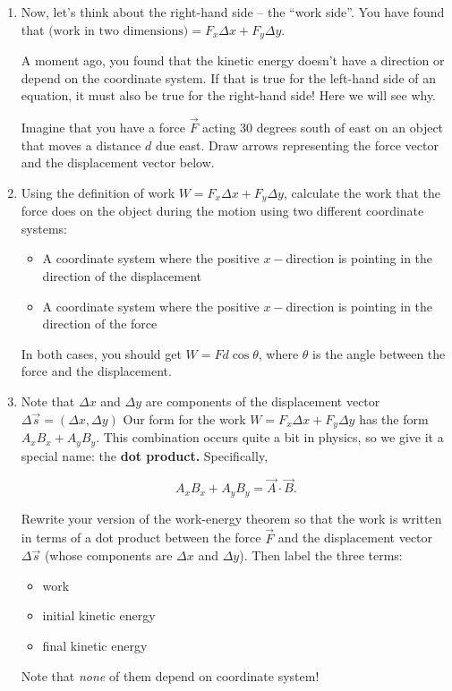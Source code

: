 \documentclass[12pt]{article}
\begin{document}
\begin{enumerate}
\item Now, let's think about the right-hand side -- the ``work side''. You have found that 
$\text{(work in two dimensions)} = F_x \Delta x + F_y \Delta y.$

A moment ago, you found that the kinetic energy doesn't have a direction or depend on the coordinate system. If that is true for the left-hand side of an equation, it must also be true for the right-hand side! Here we will see why.

Imagine that you have a force $\vec F$ acting 30 degrees south of east on an object that moves a distance $d$ due east. Draw arrows representing the force vector and the displacement vector below.
\vspace{2in}


\item Using the definition of work $W = F_x \Delta x + F_y \Delta y$, calculate the work that the force does on the object during the motion using two different coordinate systems:

\begin{itemize}
\item A coordinate system where the positive $x-$direction is pointing in the direction of the displacement

\item A coordinate system where the positive $x-$direction is pointing in the direction of the force
\end{itemize}

In both cases, you should get $W = F d \cos \theta$, where $\theta$ is the angle between the force and the displacement.

\bigskip
\newpage
\item Note that $\Delta x$ and $\Delta y$ are components of the displacement vector $\Delta \vec s = (\Delta x, \Delta y)$ Our form for the work $W = F_x \Delta x + F_y \Delta y$ has the form $A_x B_x + A_y B_y$. This combination occurs quite a bit in physics, so we give it a special name: the {\bf dot product.} Specifically,

$$A_x B_x + A_y B_y = \vec A \cdot \vec B.$$

Rewrite your version of the work-energy theorem so that the work is written in terms of a dot product between the force $\vec F$ and the displacement vector $\Delta \vec s$ (whose components are $\Delta x$ and $\Delta y$). Then label the three terms:

\begin{itemize}
\item work
\item initial kinetic energy
\item final kinetic energy
\end{itemize}

Note that {\it none} of them depend on coordinate system!

\end{enumerate}
\end{document}
